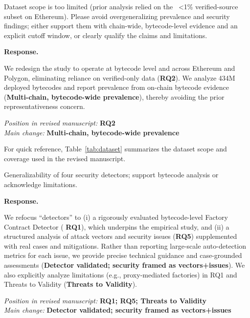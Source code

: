 \documentclass[acmsmall]{acmart}
\begin{document}
	\begin{tcolorbox}
		[commentbox,title=Reviewer \#2 -- Comment 1] Dataset scope is too limited (prior analysis
		relied on the ~<1\% verified-source subset on Ethereum). Please avoid overgeneralizing prevalence
		and security findings; either support them with chain-wide, bytecode-level evidence and an explicit
		cutoff window, or clearly qualify the claims and limitations.
	\end{tcolorbox}

	\noindent
	\textbf{Response.}

	We redesign the study to operate at bytecode level and across Ethereum and Polygon, eliminating reliance
	on verified-only data ({\textbf{RQ2}}). We analyze 434M deployed bytecodes and report prevalence
	from on-chain bytecode evidence ({\textbf{Multi-chain, bytecode-wide prevalence}}), thereby avoiding
	the prior representativeness concern.

	\textit{Position in revised manuscript:} {\color{red}\textbf{RQ2}}\\ \textit{Main change:}
	{\color{blue}\textbf{Multi-chain, bytecode-wide prevalence}}

	\vspace{0.25em}
	For quick reference, Table~\ref{tab:dataset} summarizes the dataset scope and coverage used in
	the revised manuscript.
	

	\begin{tcolorbox}
		[commentbox,title=Reviewer \#2 -- Comment 2] Generalizability of four security detectors;
		support bytecode analysis or acknowledge limitations.
	\end{tcolorbox}

	\noindent
	\textbf{Response.}

	We refocus “detectors” to (i) a rigorously evaluated bytecode-level Factory Contract Detector ( {\textbf{RQ1}}),
	which underpins the empirical study, and (ii) a structured analysis of attack vectors and
	security issues ({\textbf{RQ5}}) supplemented with real cases and mitigations. Rather than reporting
	large-scale auto-detection metrics for each issue, we provide precise technical guidance and
	case-grounded assessments ({\textbf{Detector validated; security framed as vectors+issues}}). We
	also explicitly analyze limitations (e.g., proxy-mediated factories) in RQ1 and Threats to Validity
	({\textbf{Threats to Validity}}).

	\textit{Position in revised manuscript:} {\color{red}\textbf{RQ1; RQ5; Threats to Validity}}\\ \textit{Main
	change:} {\color{blue}\textbf{Detector validated; security framed as vectors+issues}}
\end{document}
